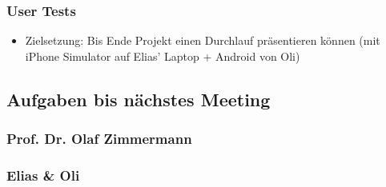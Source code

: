 \hypertarget{user-tests}{%
\subsubsection*{User Tests}\label{user-tests}}

\begin{itemize}

\item
  Zielsetzung: Bis Ende Projekt einen Durchlauf präsentieren können (mit
  iPhone Simulator auf Elias' Laptop + Android von Oli)
\end{itemize}

\hypertarget{aufgaben-bis-nachstes-meeting}{%
\subsection*{Aufgaben bis nächstes
Meeting}\label{aufgaben-bis-nachstes-meeting}}

\hypertarget{prof.-dr.-olaf-zimmermann}{%
\subsubsection*{Prof. Dr. Olaf
Zimmermann}\label{prof.-dr.-olaf-zimmermann}}

\hypertarget{elias-ux5cux26-oli}{%
\subsubsection*{Elias \& Oli}\label{elias-ux5cux26-oli}}